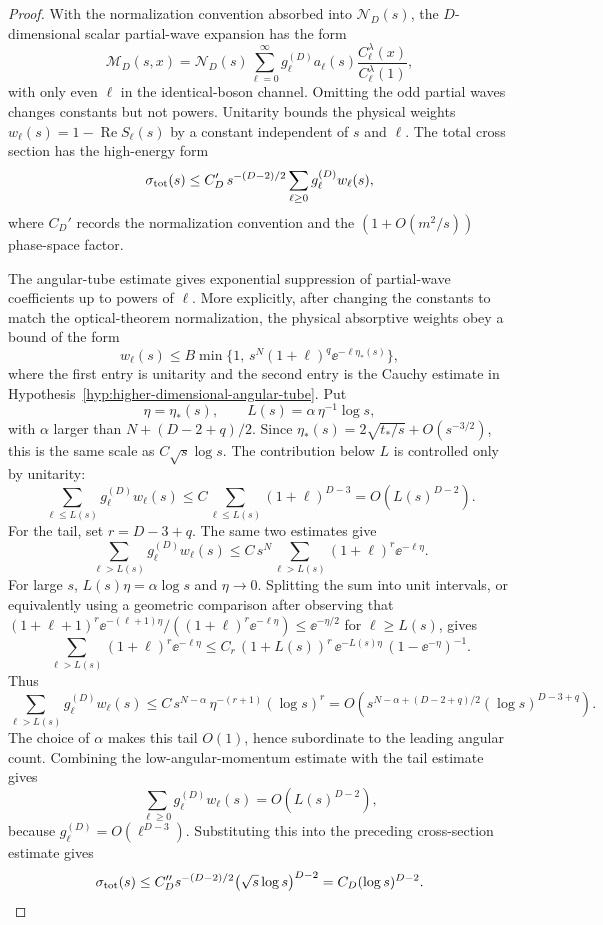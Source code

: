 \begin{proof}
With the normalization convention absorbed into \(\mathcal N_D(s)\), the
\(D\)-dimensional scalar partial-wave expansion has the form
\[
  \mathcal M_D(s,x)
  =
  \mathcal N_D(s)
  \sum_{\ell=0}^{\infty}
  g_\ell^{(D)} a_\ell(s)
  \frac{C_\ell^\lambda(x)}{C_\ell^\lambda(1)} ,
\]
with only even \(\ell\) in the identical-boson channel.  Omitting the odd
partial waves changes constants but not powers.  Unitarity bounds the physical
weights \(w_\ell(s)=1-\operatorname{Re}S_\ell(s)\) by a constant independent
of \(s\) and \(\ell\).  The total cross section has the high-energy form
\[
  \sigma_{\rm tot}(s)
  \le
  C_D'\,s^{-(D-2)/2}
  \sum_{\ell\ge0} g_\ell^{(D)}w_\ell(s),
\]
where \(C_D'\) records the normalization convention and the
\((1+O(m^2/s))\) phase-space factor.

The angular-tube estimate gives exponential suppression of partial-wave
coefficients up to powers of \(\ell\).  More explicitly, after changing the
constants to match the optical-theorem normalization, the physical absorptive
weights obey a bound of the form
\begin{equation}
  w_\ell(s)
  \le
  B\min\{1,\,s^N(1+\ell)^q\ee^{-\ell\eta_*(s)}\},
  \label{eq:higher-d-froissart-min-bound}
\end{equation}
where the first entry is unitarity and the second entry is the Cauchy estimate
in Hypothesis~\ref{hyp:higher-dimensional-angular-tube}.  Put
\[
  \eta=\eta_*(s),\qquad
  L(s)=\alpha\,\eta^{-1}\log s ,
\]
with \(\alpha\) larger than \(N+(D-2+q)/2\).  Since
\(\eta_*(s)=2\sqrt{t_*/s}+O(s^{-3/2})\), this is the same scale as
\(C\sqrt{s}\log s\).  The contribution below \(L\) is controlled only by
unitarity:
\[
  \sum_{\ell\le L(s)}g_\ell^{(D)}w_\ell(s)
  \le
  C
  \sum_{\ell\le L(s)}(1+\ell)^{D-3}
  =
  O(L(s)^{D-2}).
\]
For the tail, set \(r=D-3+q\).  The same two estimates give
\[
  \sum_{\ell>L(s)}g_\ell^{(D)}w_\ell(s)
  \le
  C\,s^N
  \sum_{\ell>L(s)}(1+\ell)^r\ee^{-\ell\eta}.
\]
For large \(s\), \(L(s)\eta=\alpha\log s\) and
\(\eta\to0\).  Splitting the sum into unit intervals, or equivalently using a
geometric comparison after observing that
\((1+\ell+1)^r\ee^{-(\ell+1)\eta}/((1+\ell)^r\ee^{-\ell\eta})
\le \ee^{-\eta/2}\) for \(\ell\ge L(s)\), gives
\[
  \sum_{\ell>L(s)}(1+\ell)^r\ee^{-\ell\eta}
  \le
  C_r\,(1+L(s))^r\,\ee^{-L(s)\eta}\,(1-\ee^{-\eta})^{-1}.
\]
Thus
\[
  \sum_{\ell>L(s)}g_\ell^{(D)}w_\ell(s)
  \le
  C\,s^{N-\alpha}\,
  \eta^{-(r+1)}(\log s)^r
  =
  O\!\left(
    s^{N-\alpha+(D-2+q)/2}(\log s)^{D-3+q}
  \right).
\]
The choice of \(\alpha\) makes this tail \(O(1)\), hence subordinate to the
leading angular count.  Combining the low-angular-momentum estimate with the
tail estimate gives
\[
  \sum_{\ell\ge0}g_\ell^{(D)}w_\ell(s)
  =
  O(L(s)^{D-2}),
\]
because \(g_\ell^{(D)}=O(\ell^{D-3})\).  Substituting this into the preceding
cross-section estimate gives
\[
  \sigma_{\rm tot}(s)
  \le
  C_D''s^{-(D-2)/2}
  \bigl(\sqrt{s}\log s\bigr)^{D-2}
  =
  C_D(\log s)^{D-2}.
\]
\end{proof}

